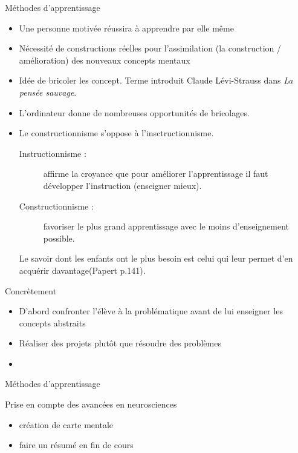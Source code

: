\begin{frame}{Méthodes d'apprentissage}
\begin{itemize}
  \item Une personne motivée réussira à apprendre par elle même
  \item Nécessité de constructions réelles pour l'assimilation (la construction / amélioration) des nouveaux concepts mentaux
  \item Idée de bricoler les concept. Terme introduit Claude Lévi-Strauss dans \textit{La pensée sauvage}. %
  \item L'ordinateur donne de nombreuses opportunités de bricolages.
  \item Le constructionnisme s'oppose à l'insctructionnisme.
  \begin{description}
    \item[Instructionnisme : ]affirme la croyance que pour améliorer l'apprentissage il faut développer l'instruction (enseigner mieux).
    \item[Constructionnisme : ]favoriser le plus grand apprentissage avec le moins d'enseignement possible.
    \end{description}
    \og{}Le savoir dont les enfants ont le plus besoin est celui qui leur permet d'en acquérir davantage\fg (Papert p.141).
\end{itemize}
\end{frame}

\begin{frame}{Concrètement}
\begin{itemize}
  \item D'abord confronter l'élève à la problématique avant de lui enseigner les concepts abstraits
  \item Réaliser des projets plutôt que résoudre des problèmes
  \item 
\end{itemize}
\end{frame}

\begin{frame}{Méthodes d'apprentissage}
  \begin{block}{Prise en compte des avancées en neurosciences}
    \begin{itemize}
    \item création de carte mentale
    \item faire un résumé en fin de cours
    \end{itemize}
  \end{block}
\end{frame}